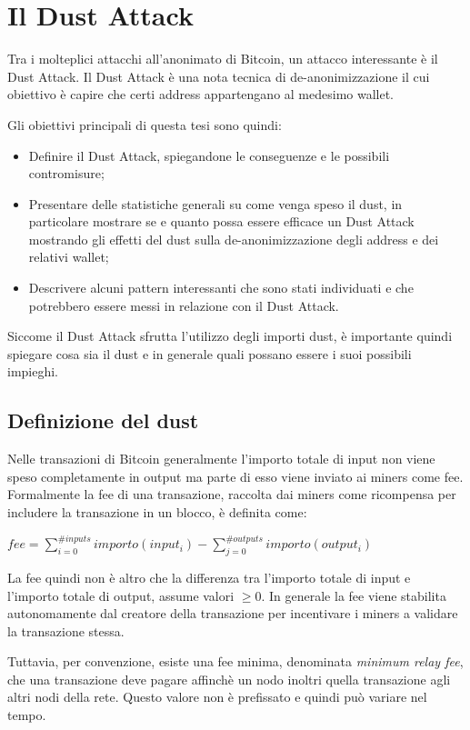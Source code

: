 \chapter{Il Dust Attack}
Tra i molteplici attacchi all'anonimato di Bitcoin, un attacco interessante è il Dust Attack. Il Dust Attack è una nota tecnica di de-anonimizzazione il cui obiettivo è capire che certi address appartengano al medesimo wallet.

Gli obiettivi principali di questa tesi sono quindi:
\begin{itemize}
\item Definire il Dust Attack, spiegandone le conseguenze e le possibili contromisure;
    \item Presentare delle statistiche generali su come venga speso il dust, in particolare mostrare se e quanto possa essere efficace un Dust Attack mostrando gli effetti del dust sulla de-anonimizzazione degli address e dei relativi wallet;
    \item Descrivere alcuni pattern interessanti che sono stati individuati e che potrebbero essere messi in relazione con il  Dust Attack.
\end{itemize}

Siccome il Dust Attack sfrutta l'utilizzo degli importi dust, è importante quindi spiegare cosa sia il dust e in generale quali possano essere i suoi possibili impieghi.
\section{Definizione del dust}
Nelle transazioni di Bitcoin generalmente l'importo totale di input non viene speso completamente in output ma parte di esso viene inviato ai miners come fee. Formalmente la fee di una transazione, raccolta dai miners come ricompensa per includere la transazione in un blocco, è definita come:
\begin{center}
    $fee = \sum_{i=0}^{\#inputs} importo(input_i) - \sum_{j=0}^{\#outputs} importo(output_i)$
\end{center}
La fee quindi non è altro che la differenza tra l'importo totale di input e l'importo totale di output, assume valori $\ge 0$. In generale la fee viene stabilita autonomamente dal creatore della transazione per incentivare i miners a validare la transazione stessa. 

Tuttavia, per convenzione, esiste una fee minima, denominata \textit{minimum relay fee}, che una transazione deve pagare affinchè un nodo inoltri quella transazione agli altri nodi della rete. Questo valore non è prefissato e quindi può variare nel tempo. 

